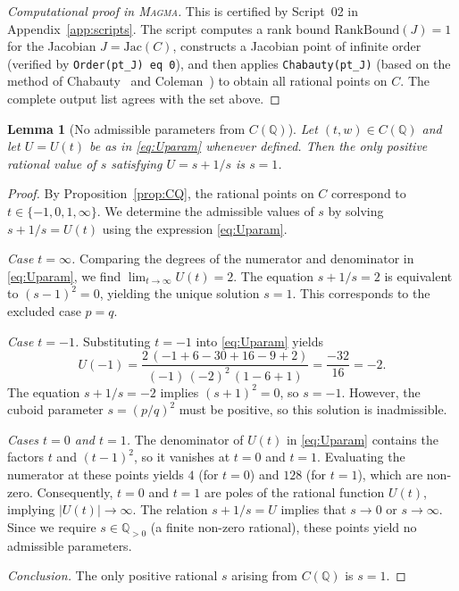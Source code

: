 \documentclass[12pt]{article}
\newtheorem{lemma}{Lemma}
\theoremstyle{remark}
\theoremstyle{definition}
\begin{document}
\begin{proof}[Computational proof in \textsc{Magma}]
This is certified by Script~02 in Appendix~\ref{app:scripts}.
The script computes a rank bound $\mathrm{RankBound}(J)=1$ for the Jacobian $J=\mathrm{Jac}(C)$, constructs a Jacobian point of infinite order (verified by \texttt{Order(pt\_J) eq 0}), and then applies \texttt{Chabauty(pt\_J)} (based on the method of Chabauty~\cite{Chabauty} and Coleman~\cite{Coleman}) to obtain all rational points on $C$.
The complete output list agrees with the set above.
\end{proof}

\begin{lemma}[No admissible parameters from $C(\mathbb{Q})$]\label{lem:noadmissible}
Let $(t,w)\in C(\mathbb{Q})$ and let $U=U(t)$ be as in \eqref{eq:Uparam} whenever defined.
Then the only positive rational value of $s$ satisfying $U=s+1/s$ is $s=1$.
\end{lemma}

\begin{proof}
By Proposition~\ref{prop:CQ}, the rational points on $C$ correspond to $t \in \{-1, 0, 1, \infty\}$. We determine the admissible values of $s$ by solving $s+1/s = U(t)$ using the expression \eqref{eq:Uparam}.

\smallskip
\noindent\emph{Case $t=\infty$.}
Comparing the degrees of the numerator and denominator in \eqref{eq:Uparam}, we find $\lim_{t\to\infty} U(t) = 2$. The equation $s+1/s=2$ is equivalent to $(s-1)^2=0$, yielding the unique solution $s=1$. This corresponds to the excluded case $p=q$.

\smallskip
\noindent\emph{Case $t=-1$.}
Substituting $t=-1$ into \eqref{eq:Uparam} yields
\[
U(-1) = \frac{2\,(-1+6-30+16-9+2)}{(-1)\,(-2)^{2}\,(1-6+1)} = \frac{-32}{16} = -2.
\]
The equation $s+1/s=-2$ implies $(s+1)^2=0$, so $s=-1$. However, the cuboid parameter $s=(p/q)^2$ must be positive, so this solution is inadmissible.

\smallskip
\noindent\emph{Cases $t=0$ and $t=1$.}
The denominator of $U(t)$ in \eqref{eq:Uparam} contains the factors $t$ and $(t-1)^2$, so it vanishes at $t=0$ and $t=1$. Evaluating the numerator at these points yields $4$ (for $t=0$) and $128$ (for $t=1$), which are non-zero.
Consequently, $t=0$ and $t=1$ are poles of the rational function $U(t)$, implying $|U(t)| \to \infty$.
The relation $s+1/s=U$ implies that $s \to 0$ or $s \to \infty$. Since we require $s \in \mathbb{Q}_{>0}$ (a finite non-zero rational), these points yield no admissible parameters.

\smallskip
\noindent\emph{Conclusion.}
The only positive rational $s$ arising from $C(\mathbb{Q})$ is $s=1$.
\end{proof}
\end{document}
